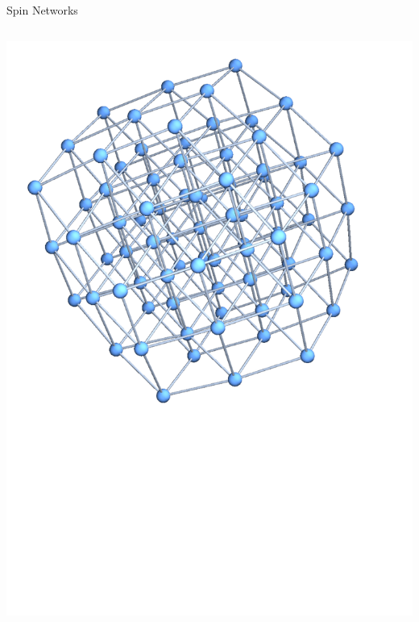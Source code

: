 \documentclass{beamer}
\begin{document}
\begin{frame}[t]{Spin Networks}
\begin{columns}[T]
\begin{column}{0.33\textwidth}
     		\includegraphics[trim=30mm 0 0 0, width=\textwidth]{Images/chain3_hypercube}
		\end{column}
	\end{columns}
\end{frame}
\end{document}
